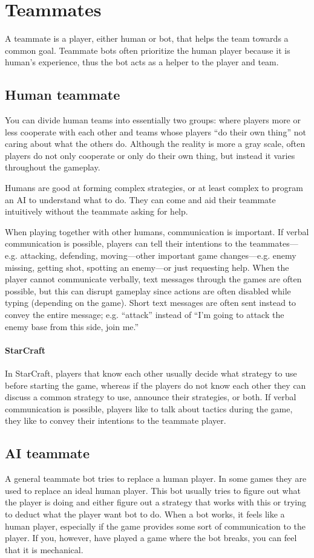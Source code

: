 \section{Teammates} A teammate is a player, either human or bot, that helps the team towards a
common goal. Teammate bots often prioritize the human player because it is human's experience, thus
the bot acts as a helper to the player and team.

\subsection{Human teammate} You can divide human teams into essentially two groups: where players
more or less cooperate with each other and teams whose players “do their own thing” not caring about
what the others do. Although the reality is more a gray scale, often players do not only cooperate
or only do their own thing, but instead it varies throughout the gameplay.

Humans are good at forming complex strategies, or at least complex to program an AI to understand
what to do. They can come and aid their teammate intuitively without the teammate asking for help.

When playing together with other humans, communication is important. If verbal communication is
possible, players can tell their intentions to the teammates—e.g. attacking, defending, moving—other
important game changes—e.g. enemy missing, getting shot, spotting an enemy—or just requesting help.
When the player cannot communicate verbally, text messages through the games are often possible, but
this can disrupt gameplay since actions are often disabled while typing (depending on the game).
Short text messages are often sent instead to convey the entire message; e.g. “attack” instead of
“I’m going to attack the enemy base from this side, join me.” 

\paragraph{StarCraft} In StarCraft, players that know each other usually decide what strategy to use
before starting the game, whereas if the players do not know each other they can discuss a common
strategy to use, announce their strategies, or both. If verbal communication is possible, players
like to talk about tactics during the game, they like to convey their intentions to the teammate
player.

\subsection{AI teammate} A general teammate bot tries to replace a human player. In some games they
are used to replace an ideal human player. This bot usually tries to figure out what the player is
doing and either figure out a strategy that works with this or trying to deduct what the player want
bot to do. When a bot works, it feels like a human player, especially if the game provides some sort
of communication to the player. If you, however, have played a game where the bot breaks, you can
feel that it is mechanical.

